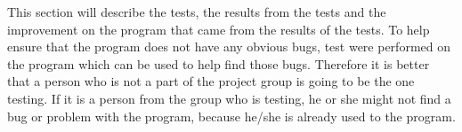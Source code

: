 This section will describe the tests, the results from the tests and the improvement on the program that came from the results of the tests. To help ensure that the program does not have any obvious bugs, test were performed on the program which can be used to help find those bugs. Therefore it is better that a person who is not a part of the project group is going to be the one testing. If it is a person from the group who is testing, he or she might not find a bug or problem with the program, because he/she is already used to the program. 